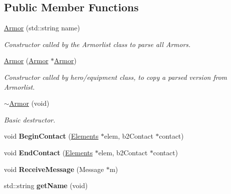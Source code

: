 \subsection*{Public Member Functions}
\begin{DoxyCompactItemize}
\item 
\hyperlink{class_armor_a13fb830c936f1a17cd5624b785c267b8}{Armor} (std\+::string name)
\begin{DoxyCompactList}\small\item\em Constructor called by the Armorlist class to parse all Armors. \end{DoxyCompactList}\item 
\hyperlink{class_armor_a755084be34b097bed1c590ebd48027a9}{Armor} (\hyperlink{class_armor}{Armor} $\ast$\hyperlink{class_armor}{Armor})
\begin{DoxyCompactList}\small\item\em Constructor called by hero/equipment class, to copy a parsed version from Armorlist. \end{DoxyCompactList}\item 
\hypertarget{class_armor_a2e523e9024a294a89710bf536648943f}{\hyperlink{class_armor_a2e523e9024a294a89710bf536648943f}{$\sim$\+Armor} (void)}\label{class_armor_a2e523e9024a294a89710bf536648943f}

\begin{DoxyCompactList}\small\item\em Basic destructor. \end{DoxyCompactList}\item 
\hypertarget{class_armor_a87f127694f13555e58b4f806c3dcd810}{void {\bfseries Begin\+Contact} (\hyperlink{class_elements}{Elements} $\ast$elem, b2\+Contact $\ast$contact)}\label{class_armor_a87f127694f13555e58b4f806c3dcd810}

\item 
\hypertarget{class_armor_a696d65777909d8f0bf600fdff6cfa58e}{void {\bfseries End\+Contact} (\hyperlink{class_elements}{Elements} $\ast$elem, b2\+Contact $\ast$contact)}\label{class_armor_a696d65777909d8f0bf600fdff6cfa58e}

\item 
\hypertarget{class_armor_ae11f8039635c404f2014170de9de070b}{void {\bfseries Receive\+Message} (Message $\ast$m)}\label{class_armor_ae11f8039635c404f2014170de9de070b}

\item 
\hypertarget{class_armor_a66dcb8d65a246ffaa43d5248a3701b7a}{std\+::string {\bfseries get\+Name} (void)}\label{class_armor_a66dcb8d65a246ffaa43d5248a3701b7a}


\end{DoxyCompactItemize}
